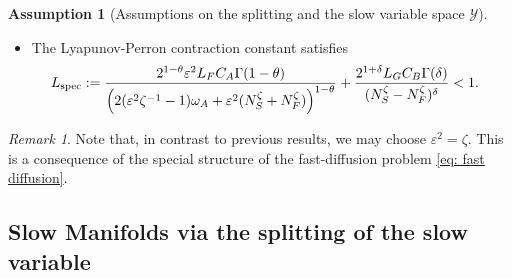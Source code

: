 \documentclass[11pt]{article}
\theoremstyle{definition}
\newtheorem{assumption}[theorem]{Assumption}
\theoremstyle{remark}
\newtheorem{remark}[theorem]{Remark}
\numberwithin{equation}{section}
\newcommand{\mc}[1]{\mathcal{#1}}
\begin{document}
\begin{assumption}[Assumptions on the splitting and the slow variable space $\mc Y$]
\begin{itemize}
    \item The Lyapunov-Perron contraction constant satisfies
    \begin{align}\label{spectral gap condition}
    L_{\mathrm{spec}}
    :={}&
    \frac{
    2^{1-\theta}\varepsilon^2 L_F C_A\Gamma(1-\theta)
    }{
    \Bigl(
    2(\varepsilon^2\zeta^{-1}-1)\omega_A
    +\varepsilon^2(N_S^\zeta+N_F^\zeta)
    \Bigr)^{1-\theta}
    }
    +
    \frac{
    2^{1+\delta}L_GC_B\Gamma(\delta)
    }{
    (N_S^\zeta-N_F^\zeta)^\delta
    }
    <1.
    \end{align}
\end{itemize}
\end{assumption}

\begin{remark}
    Note that, in contrast to previous results, we may choose $\varepsilon^2=\zeta$. This is a consequence of the special structure of the fast-diffusion problem \eqref{eq: fast diffusion}.
\end{remark}


\subsection{Slow Manifolds via the splitting of the slow variable}\label{sec:slow manifold}
\end{document}
